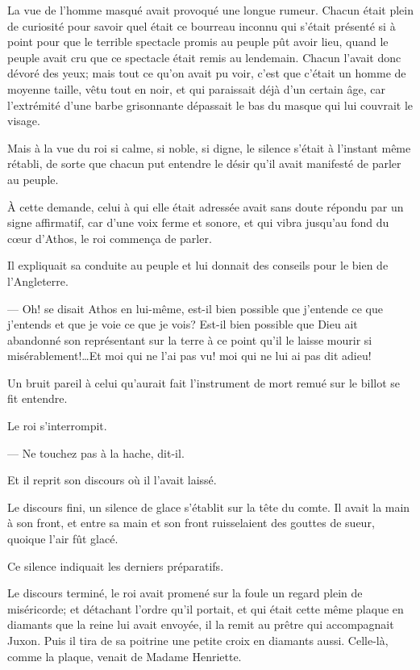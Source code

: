 La vue de l'homme masqué avait provoqué une longue rumeur. Chacun était plein de curiosité pour savoir quel était ce bourreau inconnu qui s'était présenté si à point pour que le terrible spectacle promis au peuple pût avoir lieu, quand le peuple avait cru que ce spectacle était remis au lendemain. Chacun l'avait donc dévoré des yeux; mais tout ce qu'on avait pu voir, c'est que c'était un homme de moyenne taille, vêtu tout en noir, et qui paraissait déjà d'un certain âge, car l'extrémité d'une barbe grisonnante dépassait le bas du masque qui lui couvrait le visage.

Mais à la vue du roi si calme, si noble, si digne, le silence s'était à l'instant même rétabli, de sorte que chacun put entendre le désir qu'il avait manifesté de parler au peuple.

À cette demande, celui à qui elle était adressée avait sans doute répondu par un signe affirmatif, car d'une voix ferme et sonore, et qui vibra jusqu'au fond du cœur d'Athos, le roi commença de parler.

Il expliquait sa conduite au peuple et lui donnait des conseils pour le bien de l'Angleterre.

— Oh! se disait Athos en lui-même, est-il bien possible que j'entende ce que j'entends et que je voie ce que je vois? Est-il bien possible que Dieu ait abandonné son représentant sur la terre à ce point qu'il le laisse mourir si misérablement!\dots Et moi qui ne l'ai pas vu! moi qui ne lui ai pas dit adieu!

Un bruit pareil à celui qu'aurait fait l'instrument de mort remué sur le billot se fit entendre.

Le roi s'interrompit.

— Ne touchez pas à la hache, dit-il.

Et il reprit son discours où il l'avait laissé.

Le discours fini, un silence de glace s'établit sur la tête du comte. Il avait la main à son front, et entre sa main et son front ruisselaient des gouttes de sueur, quoique l'air fût glacé.

Ce silence indiquait les derniers préparatifs.

Le discours terminé, le roi avait promené sur la foule un regard plein de miséricorde; et détachant l'ordre qu'il portait, et qui était cette même plaque en diamants que la reine lui avait envoyée, il la remit au prêtre qui accompagnait Juxon. Puis il tira de sa poitrine une petite croix en diamants aussi. Celle-là, comme la plaque, venait de Madame Henriette.


